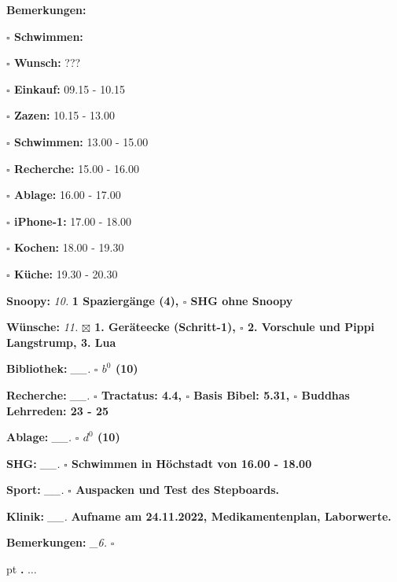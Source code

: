 \documentclass[10pt,a4paper]{article}
\newcounter{notec}
\newcommand\notep[1]{%
  \stepcounter{notec}
  \vskip #1pt
  {\bf\arabic{notec}.}
}
\newcommand\prop[1] {{\color {alizarin} {\bf #1}}}        %
\newcommand\draf[1] {{\color {amber(sae/ece)} {\bf #1}}}  %
\newcommand\opti[1] {{\color {amethyst} {\bf #1}}}        %
\newcommand\mand[1] {{\color {burntorange} {\bf #1}}}     %
\newcommand\bottomspace{\vskip 4pt}
\newcommand\n[1] { {\sl #1.} \hskip 5pt }
\begin{document}
\begin{mdframed}[style=daystyle]
\begin{labeling}{{\mand {Bemerkungen:}}}
\begin{minipage}{0.75\textwidth}
\begin{labeling}{\prop {$\square$ {Schwimmen:}}}
      \item[{\prop {$\square$ Wunsch:}}]     ???
        
      \item[{\prop {$\square$ Einkauf:}}]    09.15 - 10.15
      \item[{\prop {$\square$ Zazen:}}]      10.15 - 13.00
      \item[{\prop {$\square$ Schwimmen:}}]  13.00 - 15.00
      \item[{\prop {$\square$ Recherche:}}]  15.00 - 16.00
      \item[{\prop {$\square$ Ablage:}}]     16.00 - 17.00
      \item[{\prop {$\square$ iPhone-1:}}]   17.00 - 18.00
      \item[{\prop {$\square$ Kochen:}}]     18.00 - 19.30
      \item[{\prop {$\square$ Küche:}}]      19.30 - 20.30
      \end{labeling}
    \end{minipage}
    \bottomspace
  \item[{\mand {Snoopy:}}]         \n{10} {\draf {1 Spaziergänge (4), $\square$ SHG ohne Snoopy}}    
  \item[{\mand {Wünsche:}}]        \n{11} {\draf {$\boxtimes$ 1. Geräteecke (Schritt-1),
      $\square$ 2. Vorschule und Pippi Langstrump, 3. Lua}}
  \item[{\mand {Bibliothek:}}]   \n{\_\_} {\prop {$\square$ $b^{0}$ (10)}}
  \item[{\mand {Recherche:}}]    \n{\_\_} {\prop {$\square$ Tractatus: 4.4, $\square$ Basis Bibel: 5.31,
      $\square$ Buddhas Lehrreden: 23 - 25}}
  \item[{\mand {Ablage:}}]       \n{\_\_} {\prop {$\square$ $d^{0}$ (10)}}
  \item[{\mand {SHG:}}]          \n{\_\_} {\prop {$\square$ Schwimmen in Höchstadt von 16.00 - 18.00}}
  \item[{\opti {Sport:}}]        \n{\_\_} {\prop {$\square$ Auspacken und Test des Stepboards.}}
  \item[{\opti {Klinik:}}]       \n{\_\_} {\prop {Aufname am 24.11.2022, Medikamentenplan, Laborwerte.}}
  \item[{\mand {Bemerkungen:}}]   \n{\_6} {\draf {$\square$}}
  \end{labeling}
    
  \setcounter{notec}{0}
  
  \notep 0 $\ldots$
\end{mdframed}
\end{document}
